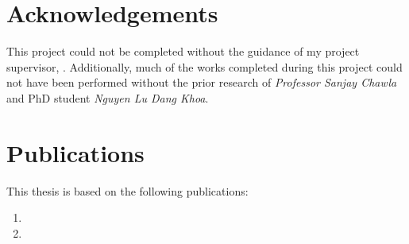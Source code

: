 \documentclass[a4paper]{report}
\begin{document}

\chapter*{Acknowledgements}
This project could not be completed without the guidance of my project 
supervisor, \supervisorName{}. Additionally, much of the works completed during
this project could not have been performed without the prior research of 
\emph{Professor Sanjay Chawla} and PhD student \emph{Nguyen Lu Dang Khoa}.

\chapter*{Publications}
This thesis is based on the following publications:
\begin{enumerate}
\item {}
\item {}
\end{enumerate}
\end{document}
